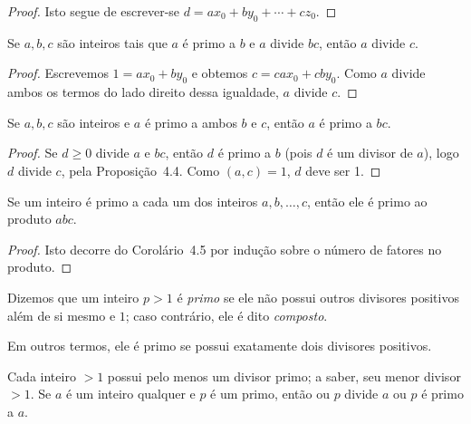 \begin{proof}
Isto segue de escrever-se $d = ax_0 + by_0 + \cdots + cz_0$.
\end{proof}

\begin{proposicao}
Se $a, b, c$ são inteiros tais que $a$ é primo a $b$ e $a$ divide $bc$, então 
$a$ divide $c$.
\end{proposicao}

\begin{proof}
Escrevemos $1 = ax_0 + by_0$ e obtemos $c = cax_0 + cby_0$.
Como $a$ divide ambos os termos do lado direito dessa igualdade, $a$ divide $c$.
\end{proof}

\begin{corolario}
Se $a, b, c$ são inteiros e $a$ é primo a ambos $b$ e $c$, então $a$ é primo a $bc$.
\end{corolario}

\begin{proof}
Se $d \geq 0$ divide $a$ e $bc$, então $d$ é primo a $b$ (pois $d$ é um divisor de $a$), 
logo $d$ divide $c$, pela Proposição~4.4. Como $(a,c) = 1$, $d$ deve ser 1.
\end{proof}

\begin{corolario}
Se um inteiro é primo a cada um dos inteiros $a, b, \ldots, c$, então ele é primo 
ao produto $abc$.
\end{corolario}

\begin{proof}
Isto decorre do Corolário~4.5 por indução sobre o número de fatores no produto.
\end{proof}

\begin{definicao}
Dizemos que um inteiro $p > 1$ é \emph{primo} se ele não possui outros divisores 
positivos além de si mesmo e $1$; caso contrário, ele é dito \emph{composto}.
\end{definicao}

Em outros termos, ele é primo se possui exatamente dois divisores positivos.

Cada inteiro $> 1$ possui pelo menos um divisor primo; a saber, seu menor divisor 
$> 1$. Se $a$ é um inteiro qualquer e $p$ é um primo, então ou $p$ divide $a$ 
ou $p$ é primo a $a$.

